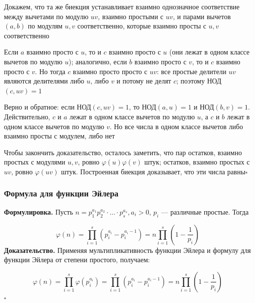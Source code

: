 \documentclass[a4paper]{article}
\newcommand{\qed}{\hfill$\square$}
\begin{document}
Докажем, что та же биекция устанавливает взаимно однозначное соответствие между вычетами по модулю $u v$, взаимно простыми с $u v$, 
и парами вычетов $(a, b)$ по модулям $u, v$ соответственно, которые взаимно просты с $u, v$ соответственно

Если $a$ взаимно просто с $u$, то и $c$ взаимно просто с $u$ (они лежат в одном классе вычетов по модулю $u$); аналогично, 
если $b$ взаимно просто с $v$, то и $c$ взаимно просто с $v$. Но тогда $c$ взаимно просто просто с $u v$: все простые делители 
$u v$ являются делителями либо $u$, либо $v$ и потому не делят $c$; поэтому НОД$(c, u v)=1$

Верно и обратное: если НОД$(c, u v)=1$, то НОД$(a, u)=1$ и НОД$(b, v)=1$. Действительно, $c$ и $a$ лежат в одном классе 
вычетов по модулю $u$, а $c$ и $b$ лежат в одном классе вычетов по модулю $v$. Но все числа в одном классе вычетов либо взаимно просты с модулем, либо нет

Чтобы закончить доказательство, осталось заметить, что пар остатков, взаимно простых с модулями $u, v$, ровно $\varphi(u) \varphi(v)$ штук; 
остатков, взаимно простых с $u v$, ровно $\varphi(u v)$ штук. Построенная биекция доказывает, что эти числа равны\qed


\subsubsection*{Формула для функции Эйлера}
\textbf{Формулировка.} Пусть $n=p_{1}^{a_{1}} p_{2}^{a_{2}} \cdot \ldots \cdot p_{s}^{a_{s}}, a_{i}>0$, $p_{i}$ — различные простые. Тогда

$$
\varphi(n)=\prod_{i=1}^{s}\left(p_{i}^{a_{i}}-p_{i}^{a_{i}-1}\right)=n \prod_{i=1}^{s}\left(1-\frac{1}{p_{i}}\right)
$$
\indent\textbf{Доказательство.} Применяя мультипликативность функции Эйлера и формулу для функции Эйлера от степени простого, получаем:

$$
\varphi(n)=\prod_{i=1}^{s} \varphi\left(p_{i}^{a_{i}}\right)=\prod_{i=1}^{s}\left(p_{i}^{a_{i}}-p_{i}^{a_{i}-1}\right)=n \prod_{i=1}^{s}\left(1-\frac{1}{p_{i}}\right)
$$\qed
\end{document}
